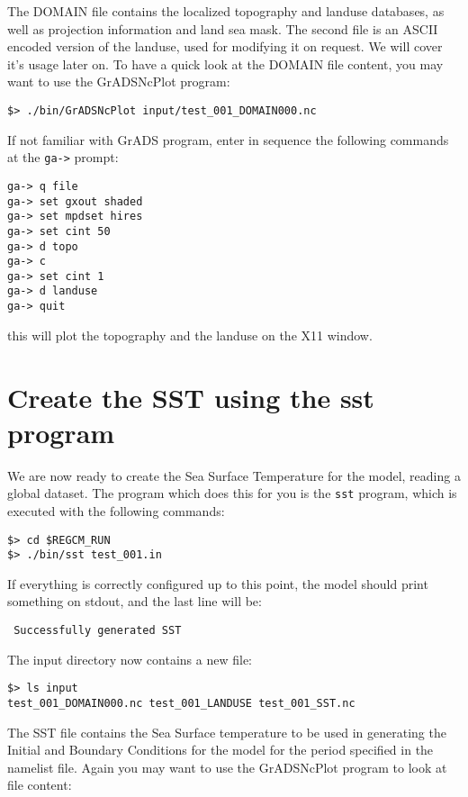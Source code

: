 The DOMAIN file contains the localized topography and landuse databases, as
well as projection information and land sea mask. The second file is an ASCII
encoded version of the landuse, used for modifying it on request. We will cover
it's usage later on.  To have a quick look at the DOMAIN file content, you may want
to use the GrADSNcPlot program:

\begin{Verbatim}
$> ./bin/GrADSNcPlot input/test_001_DOMAIN000.nc
\end{Verbatim}

If not familiar with GrADS program, enter in sequence the following commands at
the \verb=ga->= prompt:

\begin{Verbatim}
ga-> q file
ga-> set gxout shaded
ga-> set mpdset hires
ga-> set cint 50
ga-> d topo
ga-> c
ga-> set cint 1
ga-> d landuse
ga-> quit
\end{Verbatim}

this will plot the topography and the landuse on the X11 window.

\section{Create the SST using the sst program}

We are now ready to create the Sea Surface Temperature for the model, reading a
global dataset.
The program which does this for you is the \verb=sst= program, which is executed
with the following commands:

\begin{Verbatim}
$> cd $REGCM_RUN
$> ./bin/sst test_001.in
\end{Verbatim}

If everything is correctly configured up to this point, the model should print
something on stdout, and the last line will be:

\begin{Verbatim}
 Successfully generated SST
\end{Verbatim}

The input directory now contains a new file:

\begin{Verbatim}
$> ls input
test_001_DOMAIN000.nc test_001_LANDUSE test_001_SST.nc
\end{Verbatim}

The SST file contains the Sea Surface temperature to be used in generating the
Initial and Boundary Conditions for the model for the period specified in the
namelist file. Again you may want to use the GrADSNcPlot program to look at
file content:

